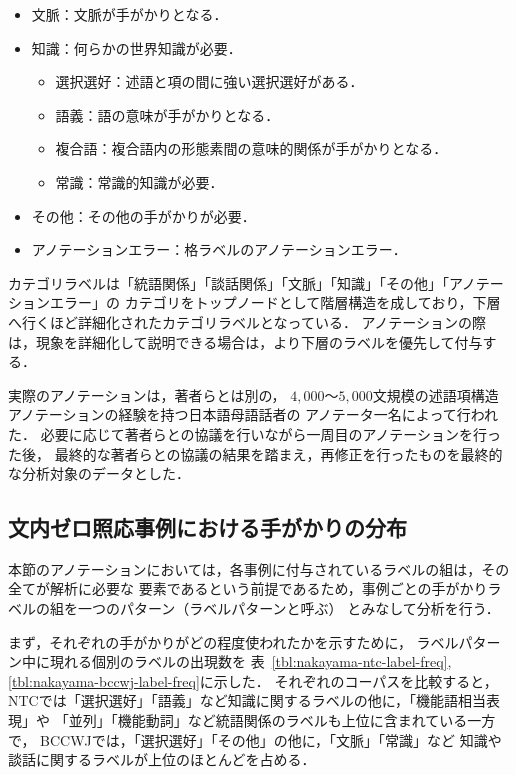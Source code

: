 \documentclass[japanese]{jnlp_1.4}
\begin{document}
\begin{itemize}
\begin{itemize}
    \end{itemize}
    \item 文脈：文脈が手がかりとなる．
    \item 知識：何らかの世界知識が必要．
    \begin{itemize}
        \item 選択選好：述語と項の間に強い選択選好がある．
        \item 語義：語の意味が手がかりとなる．
        \item 複合語：複合語内の形態素間の意味的関係が手がかりとなる．
        \item 常識：常識的知識が必要．
    \end{itemize}
    \item その他：その他の手がかりが必要．
    \item アノテーションエラー：格ラベルのアノテーションエラー．
\end{itemize}

カテゴリラベルは「統語関係」「談話関係」「文脈」「知識」「その他」「アノテーションエラー」の
カテゴリをトップノードとして階層構造を成しており，下層へ行くほど詳細化されたカテゴリラベルとなっている．
アノテーションの際は，現象を詳細化して説明できる場合は，より下層のラベルを優先して付与する．

実際のアノテーションは，著者らとは別の，
$4,000$〜$5,000$文規模の述語項構造アノテーションの経験を持つ日本語母語話者の
アノテータ一名によって行われた．
必要に応じて著者らとの協議を行いながら一周目のアノテーションを行った後，
最終的な著者らとの協議の結果を踏まえ，再修正を行ったものを最終的な分析対象のデータとした．


\subsection{文内ゼロ照応事例における手がかりの分布}

本節のアノテーションにおいては，各事例に付与されているラベルの組は，その全てが解析に必要な
要素であるという前提であるため，事例ごとの手がかりラベルの組を一つのパターン（ラベルパターンと呼ぶ）
とみなして分析を行う．

まず，それぞれの手がかりがどの程度使われたかを示すために，
ラベルパターン中に現れる個別のラベルの出現数を
表~\ref{tbl:nakayama-ntc-label-freq},\ref{tbl:nakayama-bccwj-label-freq}に示した．
それぞれのコーパスを比較すると，
NTCでは「選択選好」「語義」など知識に関するラベルの他に，「機能語相当表現」や
「並列」「機能動詞」など統語関係のラベルも上位に含まれている一方で，
BCCWJでは，「選択選好」「その他」の他に，「文脈」「常識」など
知識や談話に関するラベルが上位のほとんどを占める．
\end{document}
